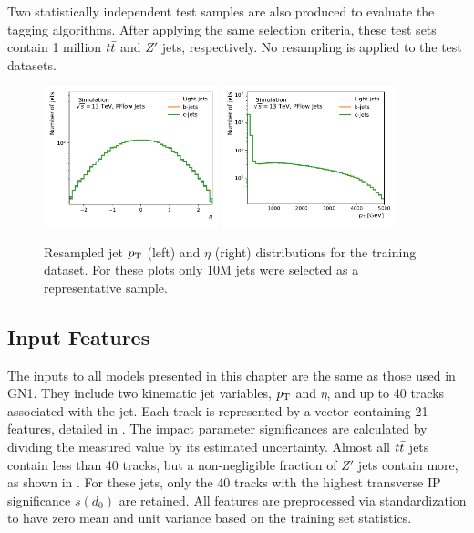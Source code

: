 Two statistically independent test samples are also produced to evaluate the tagging algorithms.
After applying the same selection criteria, these test sets contain 1 million $t\bar{t}$ and $Z'$ jets, respectively.
No resampling is applied to the test datasets.

\begin{figure}
    \centering
    \includegraphics[width=0.45\textwidth]{figures/flavour_tagging/train_0.pdf}
    \includegraphics[width=0.45\textwidth]{figures/flavour_tagging/train_1.pdf}
    \caption{Resampled jet $p_\mathrm{T}$ (left) and $\eta$ (right) distributions for the training dataset. For these plots only 10M jets were selected as a representative sample.}
    \label{fig:train_jet_pt_eta}
\end{figure}

\subsection{Input Features}

The inputs to all models presented in this chapter are the same as those used in GN1.
They include two kinematic jet variables, $p_\mathrm{T}$ and $\eta$, and up to 40 tracks associated with the jet.
Each track is represented by a vector containing 21 features, detailed in .
The impact parameter significances are calculated by dividing the measured value by its estimated uncertainty.
Almost all $t\bar{t}$ jets contain less than 40 tracks, but a non-negligible fraction of $Z'$ jets contain more, as shown in .
For these jets, only the 40 tracks with the highest transverse IP significance $s(d_0)$ are retained.
All features are preprocessed via standardization to have zero mean and unit variance based on the training set statistics.

